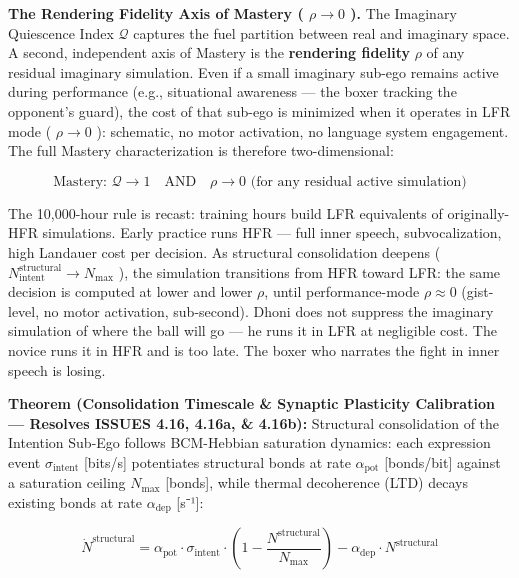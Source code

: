 \documentclass[11pt,a4paper]{article}
\theoremstyle{definition}
\theoremstyle{remark}
\begin{document}
\textbf{The Rendering Fidelity Axis of Mastery ( $\rho \to 0$ ).} The Imaginary Quiescence Index $\mathcal{Q}$ captures the fuel partition between real and imaginary space. A second, independent axis of Mastery is the \textbf{rendering fidelity} $\rho$ of any residual imaginary simulation. Even if a small imaginary sub-ego remains active during performance (e.g., situational awareness — the boxer tracking the opponent's guard), the cost of that sub-ego is minimized when it operates in LFR mode ( $\rho \to 0$ ): schematic, no motor activation, no language system engagement. The full Mastery characterization is therefore two-dimensional:


\begin{equation}
\boxed{\text{Mastery: } \mathcal{Q} \to 1 \quad \text{AND} \quad \rho \to 0 \text{ (for any residual active simulation)}}
\end{equation}


The 10,000-hour rule is recast: training hours build LFR equivalents of originally-HFR simulations. Early practice runs HFR — full inner speech, subvocalization, high Landauer cost per decision. As structural consolidation deepens ( $N_{\text{intent}}^{\text{structural}} \to N_{\text{max}}$ ), the simulation transitions from HFR toward LFR: the same decision is computed at lower and lower $\rho$, until performance-mode $\rho \approx 0$ (gist-level, no motor activation, sub-second). Dhoni does not suppress the imaginary simulation of where the ball will go — he runs it in LFR at negligible cost. The novice runs it in HFR and is too late. The boxer who narrates the fight in inner speech is losing.

\textbf{Theorem (Consolidation Timescale \& Synaptic Plasticity Calibration — Resolves ISSUES 4.16, 4.16a, \& 4.16b):} Structural consolidation of the Intention Sub-Ego follows BCM-Hebbian saturation dynamics: each expression event $\sigma_{\text{intent}}$ [bits/s] potentiates structural bonds at rate $\alpha_{\text{pot}}$ [bonds/bit] against a saturation ceiling $N_{\text{max}}$ [bonds], while thermal decoherence (LTD) decays existing bonds at rate $\alpha_{\text{dep}}$ [s⁻¹]:


\begin{equation}
\boxed{\dot{N}^{\text{structural}} = \alpha_{\text{pot}} \cdot \sigma_{\text{intent}} \cdot \left(1 - \frac{N^{\text{structural}}}{N_{\text{max}}}\right) - \alpha_{\text{dep}} \cdot N^{\text{structural}}}
\end{equation}
\end{document}
